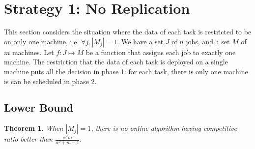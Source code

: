 \documentclass[10pt, conference, compsocconf]{IEEEtran}
\newtheorem{theorem}{Theorem}
\begin{document}
\section{Strategy 1: No Replication}\label{sec4}


This section considers the situation where the data of each task
is restricted to be on only one machine, i.e. $\forall j, |M_j|=1$.
We have a set $J$ of $ n$ jobs, and a set $M$ of $m$ machines.  Let $f
: J \mapsto M$ be a function that assigns each job to exactly one
machine. The restriction that the data of each task is deployed on a
single machine puts all the decision in phase 1: for each task,
there is only one machine is can be scheduled in phase 2.

\subsection{Lower Bound}


\begin{theorem}
\label{th:model1-lb}
  When $|M_j| = 1$, there is no online algorithm having competitive
  ratio better than $\frac{\alpha^{2}m }{\alpha^{2} + m-1}$.
\end{theorem}
 
\end{document}
